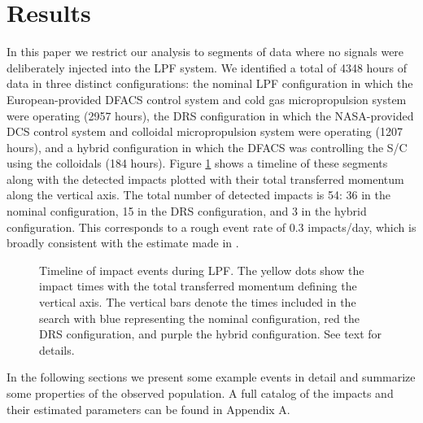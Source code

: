 \documentclass[twocolumn, trackchanges]{aastex61}
\newcommand{\nhours}{4348 }
\begin{document}
\section{Results} \label{sec:results}
In this paper we restrict our analysis to segments of data where no signals were deliberately injected into the LPF system. We identified a total of \nhours hours of data in three distinct configurations: the nominal LPF configuration in which the European-provided DFACS control system and cold gas micropropulsion system were operating (2957 hours), the DRS configuration in which the NASA-provided DCS control system and colloidal micropropulsion system were operating (1207 hours), and a hybrid configuration in which the DFACS was controlling the S/C using the colloidals (184 hours). Figure \ref{fig:timeline} shows a timeline of these segments along with the detected impacts plotted with their total transferred momentum along the vertical axis. The total number of detected impacts is 54: 36 in the nominal configuration, 15 in the DRS configuration, and 3 in the hybrid configuration. This corresponds to a rough event rate of 0.3 impacts/day, which is broadly consistent with the estimate made in \cite{Thorpe:2015cxa}. 

\begin{figure}[ht!]
\caption{Timeline of impact events during LPF. The yellow dots show the impact times with the total transferred momentum defining the vertical axis. The vertical bars denote the times included in the search with blue representing the nominal configuration, red the DRS configuration, and purple the hybrid configuration. See text for details. \label{fig:timeline}}
\end{figure}

In the following sections we present some example events in detail and summarize some properties of the observed population.  A full catalog of the impacts and their estimated parameters can be found in Appendix A.

\FloatBarrier
\end{document}
